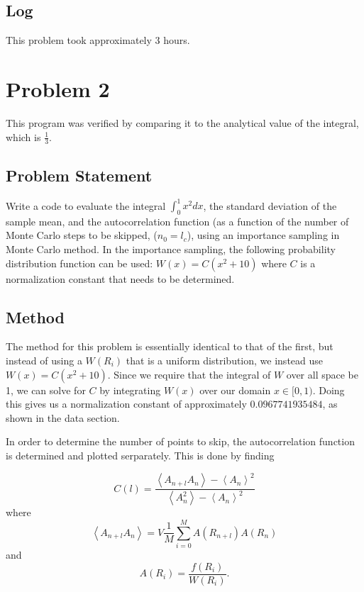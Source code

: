 \documentclass[10pt,letter]{article}
\begin{document}
\subsection{Log}

This problem took approximately 3 hours.

\section{Problem 2}

This program was verified by comparing it to the analytical value of the integral, which is $\frac{1}{3}$.

\subsection{Problem Statement}

Write a code to evaluate the integral $\int_0^1 x^2 dx$, the standard deviation of the sample mean, and the autocorrelation
function (as a function of the number of Monte Carlo steps to be skipped, ($n_0 = l_c$), using
an importance sampling in Monte Carlo method. In the importance sampling, the following probability
distribution function can be used: $W(x) = C(x^2 + 10)$ where $C$ is a normalization constant that
needs to be determined. 

\subsection{Method}

The method for this problem is essentially identical to that of the first, but instead of using a $W(R_i)$ that is a uniform distribution, we instead use $W(x) = C(x^2 + 10)$. Since we require that the integral of $W$ over all space be 1, we can solve for $C$ by integrating $W(x)$ over our domain $x \in [0,1).$ Doing this gives us a normalization constant of approximately $0.0967741935484$, as shown in the data section.

In order to determine the number of points to skip, the autocorrelation function is determined and plotted serparately. This is done by finding

$$C(l) = \frac{\left\langle A_{n+l}A_{n} \right\rangle - \left\langle A_{n}\right\rangle^2  }{\left\langle A^2_{n}\right\rangle - \left\langle A_{n}\right\rangle^2} $$
where
$$ \left\langle A_{n+l}A_{n} \right\rangle = V\frac{1}{M}\sum_{i=0}^M A(R_{n+l}) A(R_{n}) $$
and
$$A(R_i) = \frac{f(R_i)}{W(R_i)}.$$
\end{document}
